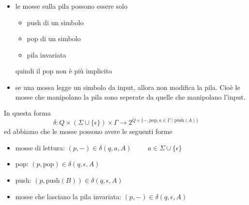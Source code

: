\documentclass[12pt]{report}
\begin{document}
\begin{itemize}
\begin{center}
		\end{center}
 	\item le mosse sulla pila possono essere solo
 		\begin{itemize}
 			\item push di un simbolo
 			\item pop di un simbolo
		 	\item pila invariata
 		\end{itemize}
 		quindi il pop non è più implicito
 	\item se una mossa legge un simbolo da input, allora non modifica la pila. 
 		Cioè le mosse che manipolano la pila sono seperate da quelle che manipolano l'input.
\end{itemize}
In questa forma
$$ \delta : Q \times (\Sigma \cup \{\epsilon\}) \times \Gamma \rightarrow 2^{Q \times \{-, \text{pop}, a \in \Gamma \mid \text{push}(A)\}} $$
ed abbiamo che le mosse possono avere le seguenti forme
\begin{itemize}
 	\item mosse di lettura: $ (p, -) \in \delta(q, a, A) \hspace{1cm} a \in \Sigma \cup \{\epsilon\} $
 	\item pop: $(p, \text{pop}) \in \delta(q, \epsilon , A) $
 	\item push: $(p, \text{push}(B)) \in \delta(q, \epsilon , A) $
 	\item mosse che lasciano la pila invariata: $(p, -) \in \delta(q, \epsilon , A) $
\end{itemize}
 
\end{document}
